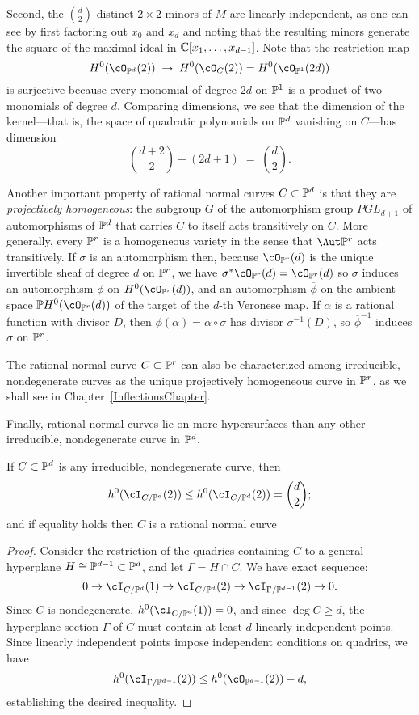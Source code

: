 Second, the ${d\choose 2}$ distinct $2\times 2$ minors of $M$ are linearly independent, as one can see by first factoring out $x_0$ and $x_d$ and noting that the resulting minors generate the square of the maximal ideal in $\CC[x_1,\dots, x_{d-1}]$. Note that
the restriction map
$$
H^0(\cO_{\PP^d}(2)) \; \to \; H^0(\cO_{C}(2)) = H^0(\cO_{\PP^1}(2d))
$$
 is surjective  because every monomial of degree $2d$ on $\PP^1$ is a product of two monomials of degree $d$. Comparing dimensions, we see that the dimension of the kernel---that is, the space of quadratic polynomials on $\PP^d$ vanishing on $C$---has dimension
$$
\binom{d+2}{2} - (2d+1) \; = \; \binom{d}{2}.
$$

Another important property of rational normal curves $C \subset \PP^d$ is that they are \emph{projectively homogeneous}: the subgroup $G$ of the automorphism group $PGL_{d+1}$ of automorphisms of $\PP^d$ that carries $C$ to itself acts transitively on $C$. More generally,
every $\PP^r$ is a homogeneous variety in the sense that $\Aut \PP^r$ acts transitively. If $\sigma$ is an automorphism then,
 because $\cO_{\PP^r}(d)$ is the unique
invertible sheaf of degree $d$ on $\PP^r$,  we have $\sigma^*\cO_{\PP^r}(d) = \cO_{\PP^r}(d)$ so $\sigma$ induces an automorphism $\phi$ on $H^0(\cO_{\PP^r}(d))$, and an automorphism $\overline \phi$ on the ambient space $\PP H^0(\cO_{\PP^r}(d))$ of the target of the $d$-th Veronese map. If $\alpha$
is a rational function with divisor $D$, then $\phi(\alpha) = \alpha\circ \sigma$ has divisor $\sigma^{-1}(D)$, so $\overline\phi^{-1}$ induces $\sigma$ on $\PP^r$. 

The rational normal curve $C \subset \PP^r$ can also be characterized among irreducible, nondegenerate curves as the unique projectively homogeneous curve in $\PP^r$, as we shall see in Chapter~\ref{InflectionsChapter}.

Finally, rational normal curves lie on more hypersurfaces than any other irreducible, nondegenerate curve in $\PP^d$.

\begin{proposition}
If $C \subset \PP^d$ is any irreducible, nondegenerate curve, then
$$
h^0(\cI_{C/\PP^d}(2)) \leq h^0(\cI_{C/\PP^d}(2)) = \binom{d}{2};
$$
and if equality holds then $C$ is a rational normal curve
\end{proposition}

\begin{proof}
Consider the restriction of the quadrics containing $C$ to a general hyperplane $H \cong \PP^{d-1} \subset \PP^d$, and let $\Gamma = H \cap C$. We have exact sequence:
$$
0 \to \cI_{C/\PP^d}(1) \to \cI_{C/\PP^d}(2) \to \cI_{\Gamma/\PP^{d-1}}(2) \to 0.
$$ 
Since $C$ is nondegenerate, $h^0(\cI_{C/\PP^d}(1)) = 0$, and since $\deg C \geq d$, the hyperplane section $\Gamma$ of $C$ must contain at least $d$ linearly independent points. Since linearly independent points impose independent conditions on quadrics, we have
$$
h^0(\cI_{\Gamma/\PP^{d-1}}(2)) \leq h^0(\cO_{\PP^{d-1}}(2)) - d,
$$
establishing the desired inequality.
\end{proof}


